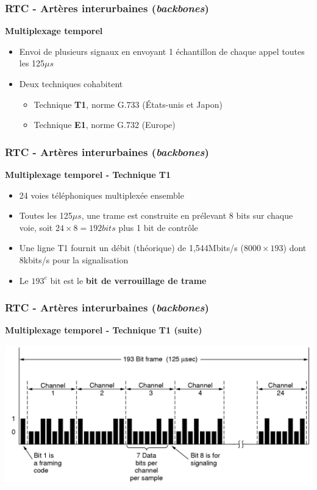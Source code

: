 \begin{frame}[fragile]
	\frametitle{RTC - Artères interurbaines (\textit{backbones})}
{\large\bf Multiplexage temporel}
\begin{itemize}
	\item Envoi de plusieurs signaux en envoyant 1 échantillon de chaque appel toutes les 125$\mu s$
	\item Deux techniques cohabitent
	\begin{itemize}
		\item Technique \textbf{T1}, norme G.733 (États-unis et Japon)
		\item Technique \textbf{E1}, norme G.732 (Europe)
	\end{itemize}
\end{itemize}
\end{frame}

\begin{frame}[fragile]
  \frametitle{RTC - Artères interurbaines (\textit{backbones})}
{\large\bf Multiplexage temporel - Technique T1}
\begin{itemize}
	\item 24 voies téléphoniques multiplexée ensemble
	\item Toutes les 125$\mu s$, une trame est construite en prélevant 8 bits
	sur chaque voie, soit $24\times 8 = 192 bits$ plus 1 bit de contrôle
	\item Une ligne T1 fournit un débit (théorique) de 1,544Mbits/s ($8000\times
	193$) dont 8kbits/s pour la signalisation
	\item Le $193^e$ bit est le \textbf{bit de verrouillage de trame}
\end{itemize}
\end{frame}

\begin{frame}[fragile]
	\frametitle{RTC - Artères interurbaines (\textit{backbones})}
{\large\bf Multiplexage temporel - Technique T1 (suite)}
\begin{center}
	\includegraphics[width=.8\linewidth]{img/2-26-old.jpg}
\end{center}
\end{frame}

